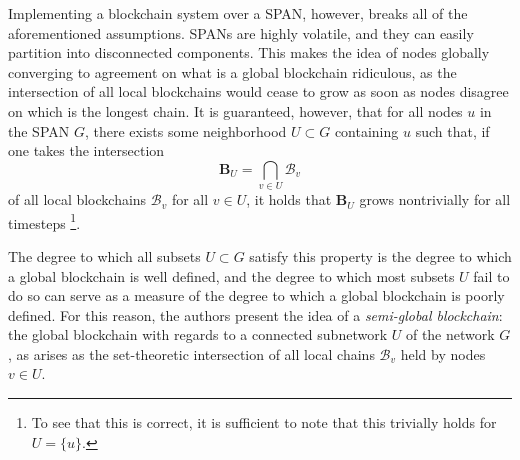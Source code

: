Implementing a blockchain system over a SPAN, however, breaks all of the
aforementioned assumptions. SPANs are highly volatile, and they can easily
partition into disconnected components. This makes the idea of nodes
globally converging to agreement on what is a global blockchain ridiculous, as
the intersection of all local blockchains would cease to grow as soon as
nodes disagree on which is the longest chain. It is guaranteed, however,
that for all nodes $u$ in the SPAN $G$, there exists some neighborhood
$U\subset G$ containing $u$ such that, if one takes the intersection
\begin{equation*}
	\mathbf{B}_U = \bigcap_{v \in U}\mathcal{B}_v
\end{equation*}
of all local blockchains $\mathcal{B}_v$ for all $v \in U$,
it holds that $\mathbf{B}_U$ grows nontrivially for all timesteps%
\footnote{
	To see that this is correct,
	it is sufficient to note that this trivially holds for $U=\{u\}$.
}.

The degree to which all subsets $U\subset G$ satisfy this property is the
degree to which a global blockchain is well defined, and the degree to which
most subsets $U$ fail to do so can serve as a measure of the degree to which
a global blockchain is poorly defined. For this reason, the authors present
the idea of a \textit{semi-global blockchain}: the global blockchain with regards
to a connected subnetwork $U$ of the network $G$, as arises
as the set-theoretic intersection of all local chains $\mathcal{B}_v$ held by
nodes $v \in U$.

